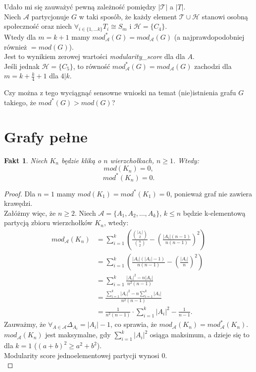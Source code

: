 \documentclass[letterpaper,12pt]{article}
\newtheorem{fact}{Fakt}
\begin{document}
  Udało mi się zauważyć pewną zależność pomiędzy \(|\mathcal{T}|\) a \(|T|\).\\

  Niech \(\mathcal{A}\) partycjonuje \(G\) w taki sposób, że każdy element \(\mathcal{T} \cup \mathcal{H}\) stanowi osobną społeczność oraz niech \(\forall_{i \in \{1, \ldots k\}} T_i \cong S_m\) i \(\mathcal{H} = \{C_4\}\).\\

  Wtedy dla \(m = k+1\) mamy \(mod^*_{\mathcal{A}}(G) = mod_{\mathcal{A}}(G)\) (a najprawdopodobniej również \(= mod(G)\)).\\
  Jest to wynikiem zerowej wartości \textit{modularity\_score} dla dla \(A\).\\


  Jeśli jednak \(\mathcal{H} = \{C_5\}\), to równość \(mod^*_{\mathcal{A}}(G) = mod_{\mathcal{A}}(G)\) zachodzi dla \(m = k+\frac{k}{4}+1\) dla \(4|k\).

  Czy można z tego wyciągnąć sensowne wnioski na temat (nie)istnienia grafu \(G\) takiego, że \(mod^*(G) > mod(G)\)?\\


\section{Grafy pełne}
  \begin{fact}
    \label{clique_mod}
    Niech \(K_n\) będzie kliką o \(n\) wierzchołkach, \(n \geq 1\). Wtedy:
    \[mod(K_n) = 0,\]
    \[mod^*(K_n) = 0.\]
  \end{fact}
  \begin{proof}
    Dla \(n=1\) mamy \(mod(K_1) = mod^*(K_1) = 0\), ponieważ graf nie zawiera krawędzi.\\
    Załóżmy więc, że \(n \geq 2\). Niech \(\mathcal{A} = \{A_1, A_2, \ldots, A_k\}\), \(k \leq n\) będzie k-elementową partycją zbioru wierzchołków \(K_n\), wtedy:
    \begin{align*}
      mod_{\mathcal{A}}(K_n) &= \sum_{i=1}^k \left(\frac{{|A_i| \choose 2}}{{n \choose 2}} - {\left(\frac{|A_i|(n-1)}{n(n-1)}\right)}^2\right) \\
      &= \sum_{i=1}^k \left(\frac{|A_i|(|A_i|-1)}{n(n-1)} - {\left(\frac{|A_i|}{n}\right)}^2\right) \\
      &= \sum_{i=1}^k \frac{|A_i|^2 - n|A_i|}{n^2(n-1)} \\
      &= \frac{\sum_{i=1}^k |A_i|^2 - n\sum_{i=1}^k |A_i|}{n^2(n-1)} \\
      &= \frac{1}{n^2(n-1)} \cdot \sum_{i=1}^k |A_i|^2 - \frac{1}{n-1}.
    \end{align*}
    Zauważmy, że \(\forall_{A \in \mathcal{A}} \Delta_{A_i} = |A_i| - 1\), co sprawia, że \(mod_{\mathcal{A}}(K_n) = mod_{\mathcal{A}}^*(K_n)\).\\
    \(mod_{\mathcal{A}}(K_n)\) jest maksymalne, gdy \(\sum_{i=1}^k |A_i|^2\) osiąga maksimum, a dzieje się to dla \(k=1\) (\((a+b)^2 \geq a^2 + b^2\)).\\
    
    Modularity score jednoelementowej partycji wynosi 0.\\
  \end{proof}
\end{document}
